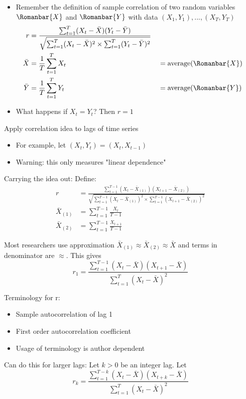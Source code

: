 \begin{itemize}
    \item Remember the definition of sample correlation of two random variables $\Romanbar{X}$ and $\Romanbar{Y}$ with data $(X_1,Y_1), ..., (X_T,Y_T)$
    \begin{align*}
        r&=\frac{\sum_{t=1}^T (X_t-\bar{X})(Y_t-\bar{Y})}{\sqrt{\sum_{t=1}^T (X_t-\bar{X})^2 \times \sum_{t=1}^T (Y_t-\bar{Y})^2}} \\
        \bar{X}&= \frac{1}{T} \sum_{t=1}^T X_t &&= \text{average}(\Romanbar{X}) \\
        \bar{Y} &= \frac{1}{T} \sum_{t=1}^T Y_t &&= \text{average}(\Romanbar{Y})
    \end{align*}
    \item What happens if $X_t=Y_t$? Then $r=1$
\end{itemize}

Apply correlation idea to lags of time series
\begin{itemize}
    \item For example, let $(X_t, Y_t)=(X_t, X_{t-1})$
    \item Warning: this only measures "linear dependence"
\end{itemize}


Carrying the idea out: 
Define:
\begin{align*}
        r&=\frac{\sum_{t=1}^{T-1} (X_t-\bar{X}_{(1)})(X_{t+1}-\bar{X}_{(2)})}{\sqrt{\sum_{t=1}^{T-1} (X_t-\bar{X}_{(1)})^2 \times \sum_{t=1}^{T-1} (X_{t+1}-\bar{X}_{(2)})^2}} \\
        \bar{X}_{(1)} &= \sum_{t=1}^{T-1} \frac{X_t}{T-1} \\
        \bar{X}_{(2)} &= \sum_{t=1}^{T-1} \frac{X_{t+1}}{T-1} 
\end{align*}

Most researchers use approximation $\bar{X}_{(1)} \approx \bar{X}_{(2)} \approx \bar{X} $ and terms in denominator are $\approx$. This gives 
$$r_1=\frac{\sum_{t=1}^{T-1} (X_t-\bar{X})(X_{t+1}-\bar{X})}{\sum_{t=1}^{T} (X_t-\bar{X})^2}$$

Terminology for r:
\begin{itemize}
    \item Sample autocorrelation of lag 1
    \item First order autocorrelation coefficient
    \item Usage of terminology is author dependent
\end{itemize}

Can do this for larger lags: \quad Let $k>0$ be an integer lag. Let 
$$r_k=\frac{\sum_{t=1}^{T-k} (X_t-\bar{X})(X_{t+k}-\bar{X})}{\sum_{t=1}^{T} (X_t-\bar{X})^2}$$

